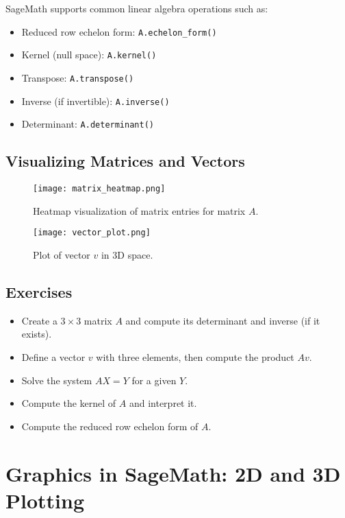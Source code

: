 \documentclass[12pt]{book}
\begin{document}
SageMath supports common linear algebra operations such as:

\begin{itemize}
  \item Reduced row echelon form: \texttt{A.echelon_form()}
  \item Kernel (null space): \texttt{A.kernel()}
  \item Transpose: \texttt{A.transpose()}
  \item Inverse (if invertible): \texttt{A.inverse()}
  \item Determinant: \texttt{A.determinant()}
\end{itemize}

\section{Visualizing Matrices and Vectors}

\begin{figure}[H]
  \centering
  \texttt{[image: matrix\_heatmap.png]}
  \caption{Heatmap visualization of matrix entries for matrix \(A\).}
  \label{fig:matrix_heatmap}
\end{figure}

\begin{figure}[H]
  \centering
  \texttt{[image: vector\_plot.png]}
  \caption{Plot of vector \(v\) in 3D space.}
  \label{fig:vector_plot}
\end{figure}

\section{Exercises}

\begin{itemize}
  \item Create a \(3 \times 3\) matrix \(A\) and compute its determinant and inverse (if it exists).
  \item Define a vector \(v\) with three elements, then compute the product \(Av\).
  \item Solve the system \(AX = Y\) for a given \(Y\).
  \item Compute the kernel of \(A\) and interpret it.
  \item Compute the reduced row echelon form of \(A\).
\end{itemize}

\chapter{Graphics in SageMath: 2D and 3D Plotting}
\end{document}
